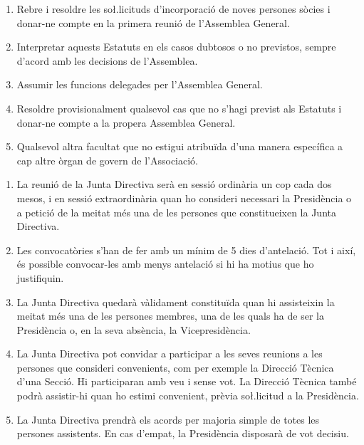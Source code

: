 \documentclass[11pt,a4paper]{article}
\newcommand{\JD}{Junta Directiva\xspace}
\newcommand{\AG}{Assemblea General\xspace}
\newcommand{\DT}{Direcció Tècnica\xspace}
\begin{document}
\begin{enumerate}
\begin{enumerate}
        \item Rebre i resoldre les so\l.licituds d'incorporació de noves persones sòcies i donar-ne compte en la primera reunió de l'\AG.
        \item Interpretar aquests Estatuts en els casos dubtosos o no previstos, sempre d'acord amb les decisions de l'Assemblea.
        \item Assumir les funcions delegades per l'\AG.
        \item Resoldre provisionalment qualsevol cas que no s'hagi previst als Estatuts i donar-ne compte a la propera \AG.
        \item Qualsevol altra facultat que no estigui atribuïda d'una manera específica a cap altre òrgan de govern de l'Associació.
    \end{enumerate}
\end{enumerate}

\Art{Reunió de la \JD}

\begin{enumerate}
    \item La reunió de la \JD serà en sessió ordinària un cop cada dos mesos, i en sessió extraordinària quan ho consideri necessari la Presidència o a petició de la meitat més una de les persones que constitueixen la \JD.
    \item Les convocatòries s'han de fer amb un mínim de 5 dies d'antelació. Tot i així, és possible convocar-les amb menys antelació si hi ha motius que ho justifiquin.
    \item La \JD quedarà vàlidament constituïda quan hi assisteixin la meitat més una de les persones membres, una de les quals ha de ser la Presidència o, en la seva absència, la Vicepresidència.
    \item La \JD pot convidar a participar a les seves reunions a les persones que consideri convenients, com per exemple la \DT d'una Secció. Hi participaran amb veu i sense vot. La \DT també podrà assistir-hi quan ho estimi convenient, prèvia so\l.licitud a la Presidència.
    \item La \JD prendrà els acords per majoria simple de totes les persones assistents. En cas d'empat, la Presidència disposarà de vot decisiu.
\end{enumerate}

\end{document}
